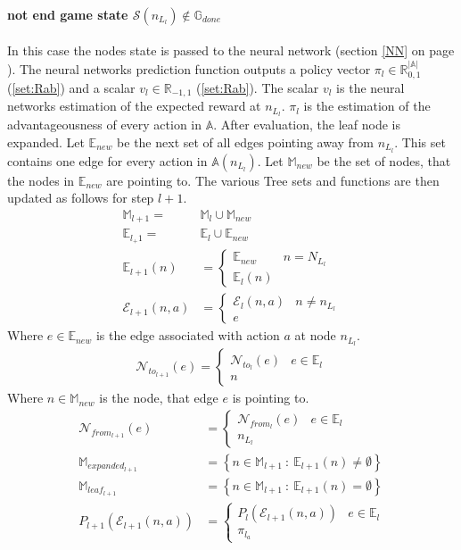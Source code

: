 \documentclass[12pt]{article}
\newcommand{\sectionref}[1]{section \ref{#1} on page \pageref{#1}}
\newcommand{\quckeq}[1]{(\ref{#1})}
\begin{document}
\paragraph{not end game state \(\mathcal S(n_{L_l}) \not\in \mathbb G_{done}\)}
In this case the nodes state is passed to the neural network (\sectionref{NN}). The neural networks prediction function outputs a policy vector \(\pi_l \in \mathbb R_{0,1}^{|\mathbb A|}\) \quckeq{set:Rab} and a scalar \(v_l \in \mathbb R_{-1,1}\) \quckeq{set:Rab}. The scalar \(v_l\) is the neural networks estimation of the expected reward at \(n_{L_l}\). \(\pi_l\) is the estimation of the advantageousness of every action in \(\mathbb A\). After evaluation, the leaf node is expanded.
Let \(\mathbb E_{new}\) be the next set of all edges pointing away from \(n_{L_l}\). This set contains one edge for every action in \(\mathbb A(n_{L_l})\).
Let \(\mathbb M_{new}\) be the set of nodes, that the nodes in \(\mathbb E_{new}\) are pointing to.
The various Tree sets and functions are then updated as follows for step \(l+1\).
\begin{align}
\mathbb M_{l+1}   =& \mathbb M_l \cup \mathbb M_{new} \\
\mathbb E_{l_+1}  =& \mathbb E_l  \cup \mathbb E_{new} \\
%
\mathbb E_{l+1}(n) &= 
\left\{
\begin{matrix}
\mathbb E_{new} & n = N_{L_l}\\
\mathbb E_l(n)
\end{matrix}
\right.\\
%
\mathcal E_{l+1}(n, a) &=
\left\{
\begin{matrix}
\mathcal E_l (n, a) & n\neq n_{L_l}\\
e &
\end{matrix}
\right.
\end{align}
Where \(e \in\mathbb E_{new}\) is the edge associated with action \(a\) at node \(n_{L_l}\).
\begin{align}
\mathcal N_{to_{l+1}}(e) = 
\left\{
\begin{matrix}
\mathcal N_{to_l} (e) & e \in \mathbb E_l\\
n &
\end{matrix}
\right.
\end{align}
Where \(n\in\mathbb M_{new}\) is the node, that edge \(e\) is pointing to.
\begin{align}
\mathcal N_{from_{l+1}}(e) &= 
\left\{
\begin{matrix}
\mathcal N_{from_l} (e) & e \in\mathbb E_l\\
n _{L_l}&
\end{matrix}
\right.\\
\mathbb M_{expanded_{l+1}} &= \left\{n\in\mathbb M_{l+1}~:~\mathbb E_{l+1}(n) \neq \emptyset\right\}\\
\mathbb M_{leaf_{l+1}} &= \left\{n\in\mathbb M_{l+1}~:~\mathbb E_{l+1}(n) = \emptyset\right\}\\
P_{l+1}(\mathcal E_{l+1}(n, a)) &= 
\left\{
\begin{matrix}
P_l (\mathcal E_{l+1}(n, a)) & e \in\mathbb E_l\\
\pi_{l_a}&
\end{matrix}
\right.
\end{align}
\end{document}
